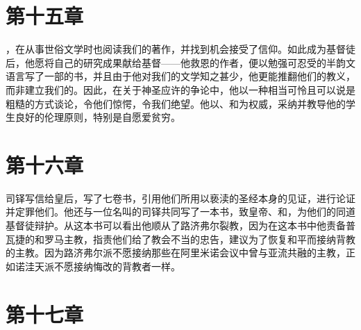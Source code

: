 
\section{第十五章}

，在从事世俗文学时也阅读我们的著作，并找到机会接受了信仰。如此成为基督徒后，他愿将自己的研究成果献给基督——他救恩的作者，便以勉强可忍受的半韵文语言写了一部的书，并且由于他对我们的文学知之甚少，他更能推翻他们的教义，而非建立我们的。因此，在关于神圣应许的争论中，他以一种相当可怜且可以说是粗糙的方式谈论，令他们惊愕，令我们绝望。他以、和为权威，采纳并教导他的学生良好的伦理原则，特别是自愿爱贫穷。\par


\section{第十六章}

司铎写信给皇后，写了七卷书，引用他们所用以亵渎的圣经本身的见证，进行论证并定罪他们。他还与一位名叫的司铎共同写了一本书，致皇帝、和，为他们的同道基督徒辩护。从这本书可以看出他顺从了路济弗尔裂教，因为在这本书中他责备普瓦捷的和罗马主教，指责他们给了教会不当的忠告，建议为了恢复和平而接纳背教的主教。因为路济弗尔派不愿接纳那些在阿里米诺会议中曾与亚流共融的主教，正如诺洼天派不愿接纳悔改的背教者一样。\par


\section{第十七章}

